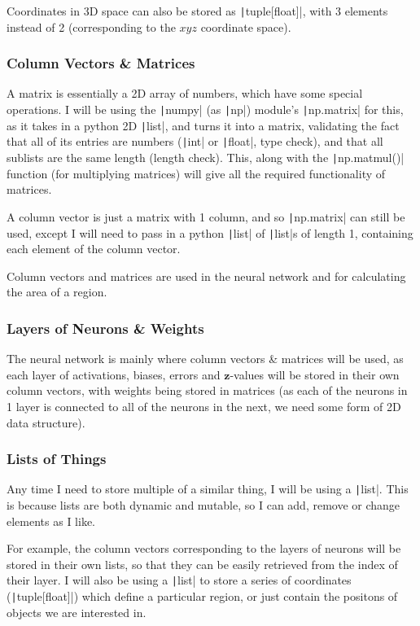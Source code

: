 \documentclass[12pt]{report}
\newcommand{\pil}[1]{\protect\texttt|#1|}
\begin{document}
Coordinates in 3D space can also be stored as \pil{tuple[float]}, with 3 elements instead of 2 (corresponding to the $xyz$ coordinate space).

\subsubsection{Column Vectors \& Matrices}
A matrix is essentially a 2D array of numbers, which have some special operations. I will be using the \pil{numpy} (as \pil{np}) module's \pil{np.matrix} for this, as it takes in a python 2D \pil{list}, and turns it into a matrix, validating the fact that all of its entries are numbers (\pil{int} or \pil{float}, type check), and that all sublists are the same length (length check). This, along with the \pil{np.matmul()} function (for multiplying matrices) will give all the required functionality of matrices.

A column vector is just a matrix with 1 column, and so \pil{np.matrix} can still be used, except I will need to pass in a python \pil{list} of \pil{list}s of length 1, containing each element of the column vector.

Column vectors and matrices are used in the neural network and for calculating the area of a region.

\subsubsection{Layers of Neurons \& Weights}
The neural network is mainly where column vectors \& matrices will be used, as each layer of activations, biases, errors and $\mathbf{z}$-values will be stored in their own column vectors, with weights being stored in matrices (as each of the neurons in 1 layer is connected to all of the neurons in the next, we need some form of 2D data structure).

\subsubsection{Lists of Things}
Any time I need to store multiple of a similar thing, I will be using a \pil{list}. This is because lists are both dynamic and mutable, so I can add, remove or change elements as I like.

For example, the column vectors corresponding to the layers of neurons will be stored in their own lists, so that they can be easily retrieved from the index of their layer. I will also be using a \pil{list} to store a series of coordinates (\pil{tuple[float]}) which define a particular region, or just contain the positons of objects we are interested in.
\end{document}
